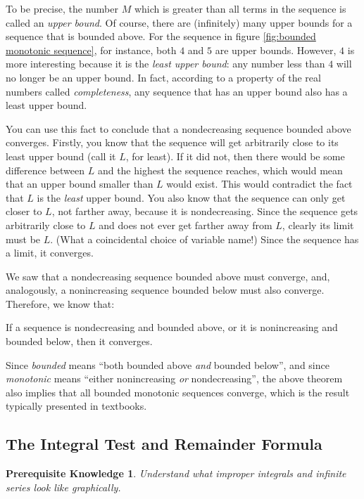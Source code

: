 \documentclass{myarticle}
\theoremstyle{nospace}
\newtheorem*{oldprereq}{Prerequisite Knowledge}
\newenvironment{prereq}
{\begin{mdframed}\begin{oldprereq}}
    {\end{oldprereq}\end{mdframed}}
\newtheorem{old series theorem}{Theorem}
\newenvironment{series theorem}
{\begin{mdframed}\begin{old series theorem}}
    {\end{old series theorem}\end{mdframed}}
\begin{document}
To be precise, the number $M$ which is greater than all terms in the
sequence is called an \emph{upper bound}. Of course, there are
(infinitely) many upper bounds for a sequence that is bounded above.
For the sequence in figure \ref{fig:bounded monotonic sequence}, for
instance, both $4$ and $5$ are upper bounds. However, $4$ is more
interesting because it is the \emph{least upper bound}: any number
less than $4$ will no longer be an upper bound. In fact, according to
a property of the real numbers called \emph{completeness}, any
sequence that has an upper bound also has a least upper bound.

You can use this fact to conclude that a nondecreasing sequence
bounded above converges. Firstly, you know that the sequence will get
arbitrarily close to its least upper bound (call it $L$, for least).
If it did not, then there would be some difference between $L$ and the
highest the sequence reaches, which would mean that an upper bound
smaller than $L$ would exist. This would contradict the fact that $L$
is the \emph{least} upper bound. You also know that the sequence can
only get closer to $L$, not farther away, because it is nondecreasing.
Since the sequence gets arbitrarily close to $L$ and does not ever get
farther away from $L$, clearly its limit must be $L$. (What a
coincidental choice of variable name!) Since the sequence has a limit,
it converges.

We saw that a nondecreasing sequence bounded above must converge, and,
analogously, a nonincreasing sequence bounded below must also
converge. Therefore, we know that:

\begin{series theorem}
  If a sequence is nondecreasing and bounded above, or it is
  nonincreasing and bounded below, then it converges.
\end{series theorem}

Since \emph{bounded} means ``both bounded above \emph{and} bounded
below'', and since \emph{monotonic} means ``either nonincreasing
\emph{or} nondecreasing'', the above theorem also implies that all
bounded monotonic sequences converge, which is the result typically
presented in textbooks.

\subsection{The Integral Test and Remainder Formula}
\label{sec:integral test}

\begin{prereq}
  Understand what improper integrals and infinite series look like
  graphically.
\end{prereq}
\end{document}
